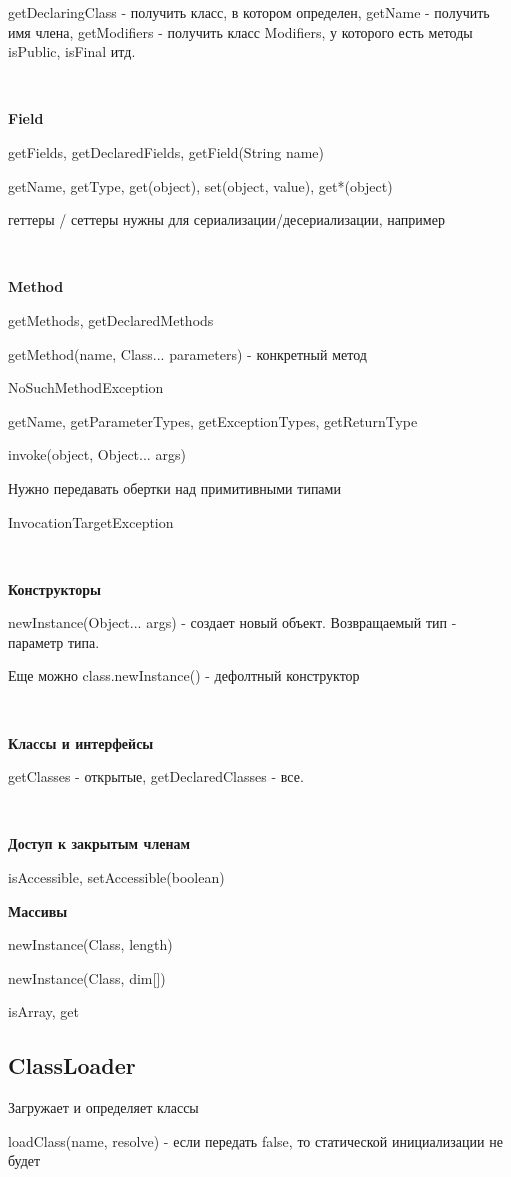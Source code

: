 \documentclass{article}
\begin{document}
getDeclaringClass - получить класс, в котором определен, getName - получить имя члена, getModifiers - получить класс Modifiers, у которого есть методы isPublic, isFinal итд.

~\

\textbf{Field}

getFields, getDeclaredFields, getField(String name)

getName, getType, get(object), set(object, value), get*(object)

геттеры / сеттеры нужны для сериализации/десериализации, например

~\

\textbf{Method}

getMethods, getDeclaredMethods

getMethod(name, Class... parameters) - конкретный метод

NoSuchMethodException

getName, getParameterTypes, getExceptionTypes, getReturnType

invoke(object, Object... args)

Нужно передавать обертки над примитивными типами

InvocationTargetException

~\

\textbf{Конструкторы}

newInstance(Object... args) - создает новый объект. Возвращаемый тип - параметр типа.

Еще можно class.newInstance() - дефолтный конструктор

~\

\textbf{Классы и интерфейсы}

getClasses - открытые, getDeclaredClasses - все.

~\

\textbf{Доступ к закрытым членам}

isAccessible, setAccessible(boolean)

\textbf{Массивы}

newInstance(Class, length)

newInstance(Class, dim[])

isArray, get

\subsection{ClassLoader}

Загружает и определяет классы

loadClass(name, resolve) - если передать false, то статической инициализации не будет
\end{document}
